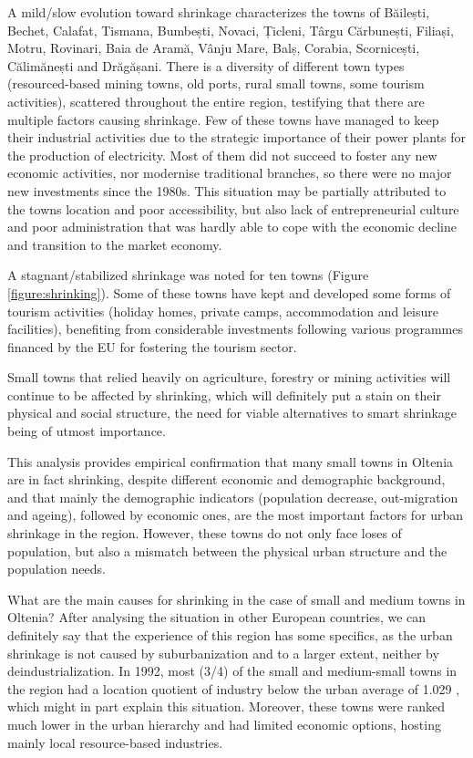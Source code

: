 A mild/slow evolution toward shrinkage characterizes the towns of Băilești, Bechet, Calafat, Tismana, Bumbești, Novaci, Țicleni, Târgu Cărbunești, Filiași, Motru, Rovinari, Baia de Aramă, Vânju Mare, Balș, Corabia, Scornicești, Călimănești and Drăgășani. There is a diversity of different town types (resourced-based mining towns, old ports, rural small towns, some tourism activities), scattered throughout the entire region, testifying that there are multiple factors causing shrinkage. Few of these towns have managed to keep their industrial activities due to the strategic importance of their power plants for the production of electricity. Most of them did not succeed to foster any new economic activities, nor modernise traditional branches, so there were no major new investments since the 1980s. This situation may be partially attributed to the towns location and poor accessibility, but also lack of entrepreneurial culture and poor administration that was hardly able to cope with the economic decline and transition to the market economy.

A stagnant/stabilized shrinkage was noted for ten towns (Figure \ref{figure:shrinking}). Some of these towns have kept and developed some forms of tourism activities (holiday homes, private camps, accommodation and leisure facilities), benefiting from considerable investments following various programmes financed by the EU for fostering the tourism sector.

Small towns that relied heavily on agriculture, forestry or mining activities will continue to be affected by shrinking, which will definitely put a stain on their physical and social structure, the need for viable alternatives to smart shrinkage being of utmost importance.

This analysis provides empirical confirmation that many small towns in Oltenia are in fact shrinking, despite different economic and demographic background, and that mainly the demographic indicators (population decrease, out-migration and ageing), followed by economic ones, are the most important factors for urban shrinkage in the region. However, these towns do not only face loses of population, but also a mismatch between the physical urban structure and the population needs.

What are the main causes for shrinking in the case of small and medium towns in Oltenia? After analysing the situation in other European countries, we can definitely say that the experience of this region has some specifics, as the urban shrinkage is not caused by suburbanization and to a larger extent, neither by deindustrialization. In 1992, most (3/4) of the small and medium-small towns in the region had a location quotient of industry below the urban average of 1.029 \citep{popescu_deindustrialization_2014}, which might in part explain this situation. Moreover, these towns were ranked much lower in the urban hierarchy and had limited economic options, hosting mainly local resource-based industries.

